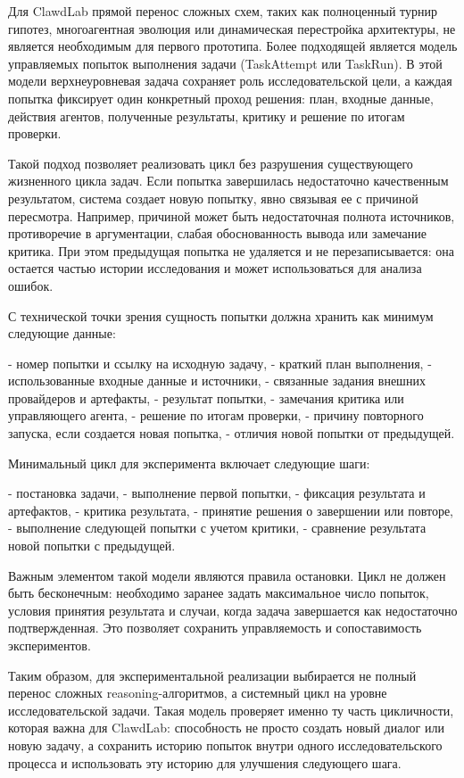 Для ClawdLab прямой перенос сложных схем, таких как полноценный турнир гипотез, многоагентная эволюция или динамическая перестройка архитектуры, не является необходимым для первого прототипа. Более подходящей является модель управляемых попыток выполнения задачи (TaskAttempt или TaskRun). В этой модели верхнеуровневая задача сохраняет роль исследовательской цели, а каждая попытка фиксирует один конкретный проход решения: план, входные данные, действия агентов, полученные результаты, критику и решение по итогам проверки.

Такой подход позволяет реализовать цикл без разрушения существующего жизненного цикла задач. Если попытка завершилась недостаточно качественным результатом, система создает новую попытку, явно связывая ее с причиной пересмотра. Например, причиной может быть недостаточная полнота источников, противоречие в аргументации, слабая обоснованность вывода или замечание критика. При этом предыдущая попытка не удаляется и не перезаписывается: она остается частью истории исследования и может использоваться для анализа ошибок.

С технической точки зрения сущность попытки должна хранить как минимум следующие данные:

- номер попытки и ссылку на исходную задачу,
- краткий план выполнения,
- использованные входные данные и источники,
- связанные задания внешних провайдеров и артефакты,
- результат попытки,
- замечания критика или управляющего агента,
- решение по итогам проверки,
- причину повторного запуска, если создается новая попытка,
- отличия новой попытки от предыдущей.

Минимальный цикл для эксперимента включает следующие шаги:

- постановка задачи,
- выполнение первой попытки,
- фиксация результата и артефактов,
- критика результата,
- принятие решения о завершении или повторе,
- выполнение следующей попытки с учетом критики,
- сравнение результата новой попытки с предыдущей.

Важным элементом такой модели являются правила остановки. Цикл не должен быть бесконечным: необходимо заранее задать максимальное число попыток, условия принятия результата и случаи, когда задача завершается как недостаточно подтвержденная. Это позволяет сохранить управляемость и сопоставимость экспериментов.

Таким образом, для экспериментальной реализации выбирается не полный перенос сложных reasoning-алгоритмов, а системный цикл на уровне исследовательской задачи. Такая модель проверяет именно ту часть цикличности, которая важна для ClawdLab: способность не просто создать новый диалог или новую задачу, а сохранить историю попыток внутри одного исследовательского процесса и использовать эту историю для улучшения следующего шага.

